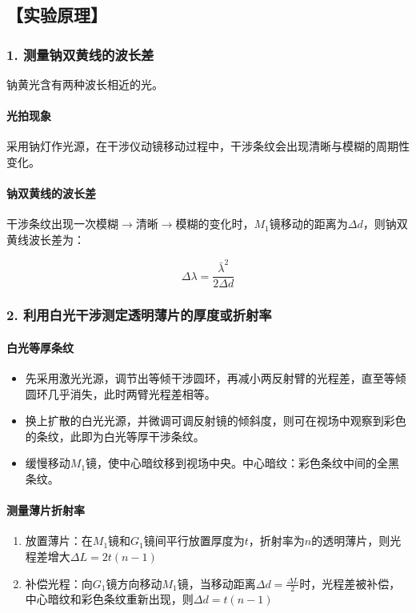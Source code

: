 \documentclass[12pt,a4paper,UTF8]{ctexart}
\begin{document}
\subsection*{【实验原理】}
    \subsubsection*{1. 测量钠双黄线的波长差}
    钠黄光含有两种波长相近的光。
    \paragraph*{光拍现象} 采用钠灯作光源，在干涉仪动镜移动过程中，干涉条纹会出现清晰与模糊的周期性变化。
    \paragraph*{钠双黄线的波长差} 干涉条纹出现一次模糊$\to$清晰$\to$模糊的变化时，$M_1$镜移动的距离为$\Delta d$，则钠双黄线波长差为：
    
	$$
    \Delta \lambda = \frac{\bar\lambda^2}{2\Delta d}
    $$

    \subsubsection*{2. 利用白光干涉测定透明薄片的厚度或折射率}
    \paragraph*{白光等厚条纹}
    \newline
    \indent
    \begin{itemize}
			\item 先采用激光光源，调节出等倾干涉圆环，再减小两反射臂的光程差，直至等倾圆环几乎消失，此时两臂光程差相等。
			\item 换上扩散的白光光源，并微调可调反射镜的倾斜度，则可在视场中观察到彩色的条纹，此即为白光等厚干涉条纹。
			\item 缓慢移动$M_1$镜，使中心暗纹移到视场中央。中心暗纹：彩色条纹中间的全黑条纹。
		\end{itemize}
    \paragraph*{测量薄片折射率}
    \newline
    \indent
    \begin{enumerate}[label=\arabic*.]
        \item 放置薄片：在$M_1$镜和$G_1$镜间平行放置厚度为$t$，折射率为$n$的透明薄片，则光程差增大$\Delta L=2t(n-1)$
        \item 补偿光程：向$G_1$镜方向移动$M_1$镜，当移动距离$\Delta d = \frac{\Delta L}{2}$时，光程差被补偿，中心暗纹和彩色条纹重新出现，则$\Delta d = t(n-1)$
    \end{enumerate}	
\end{document}
